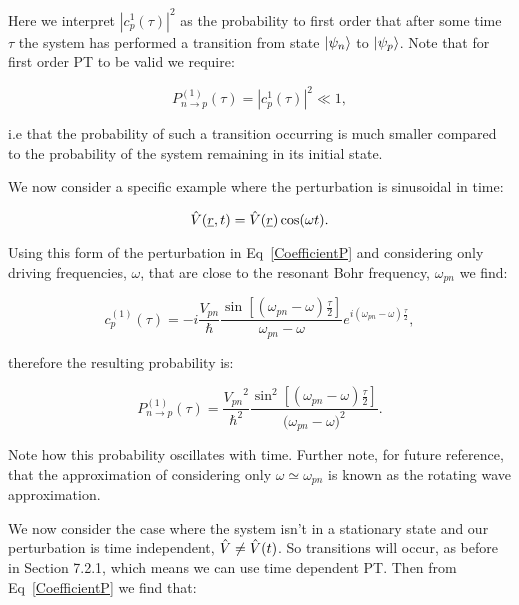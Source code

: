 \noindent Here we interpret $|c^{1}_p(\tau)|^2$ as the probability to first order that after some time $\tau$ the system has performed a transition from state $\ket{\psi_n}$ to $\ket{\psi_p}$. Note that for first order PT to be valid we require:

\begin{equation}
    P^{(1)}_{n \rightarrow p}(\tau) = |c^{1}_p(\tau)|^2 \ll 1,
    \label{ConditionFirstOrderPT}
\end{equation}

\noindent i.e that the probability of such a transition occurring is much smaller compared to the probability of the system remaining in its initial state.

\noindent We now consider a specific example where the perturbation is sinusoidal in time:

\begin{equation}
    \Hat{V}(\underline{r}, t) = \Hat{V}(\underline{r}) \cos(\omega t)
    \label{SinusoidalPerturbation}.
\end{equation}

\noindent Using this form of the perturbation in Eq~\ref{CoefficientP} and considering only driving frequencies, $\omega$, that are close to the resonant Bohr frequency, $\omega_{pn}$ we find:

\begin{equation}
    c^{(1)}_p(\tau) = -i \frac{V_{pn}}{\hbar} \frac{\sin[(\omega_{pn} - \omega)\frac{\tau}{2}]}{\omega_{pn} - \omega} e^{i(\omega_{pn} - \omega) \frac{\tau}{2}},
    \label{SinusoidalPerturbationCoefficient}
\end{equation}

\noindent therefore the resulting probability is:

\begin{equation}
    P^{(1)}_{n \rightarrow p}(\tau) = \frac{{V_{pn}}^2}{\hbar^2} \frac{\sin^2[(\omega_{pn} - \omega)\frac{\tau}{2}]}{{(\omega_{pn} - \omega})^2}
    \label{SinusoidalPerturbationProbability}.
\end{equation}

\noindent Note how this probability oscillates with time. Further note, for future reference, that the approximation of considering only $\omega \simeq \omega_{pn}$ is known as the rotating wave approximation.

\noindent We now consider the case where the system isn't in a stationary state and our perturbation is time independent, $\Hat{V} \neq \Hat{V}(t)$. So transitions will occur, as before in Section 7.2.1, which means we can use time dependent PT. Then from Eq~\ref{CoefficientP} we find that:

